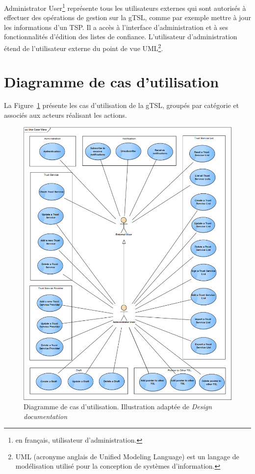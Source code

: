 \documentclass{tnreport}
\begin{document}
Administrator User\footnote{en français, utilisateur d'administration.} représente tous les utilisateurs externes qui sont autorisés à effectuer des opérations de gestion sur la gTSL, comme par exemple mettre à jour les informations d'un TSP. Il a accès à l'interface d'administration et à ses fonctionnalités d'édition des listes de confiance. L'utilisateur d'administration étend de l'utilisateur externe du point de vue UML\footnote{UML (acronyme anglais de Unified Modeling Language) est un langage de modélisation utilisé pour la conception de systèmes d'information.}.

\section{Diagramme de cas d'utilisation}

La Figure~\ref{fig:use-case-diagram} présente les cas d'utilisation de la gTSL, groupés par catégorie et associés aux acteurs réalisant les actions.

\begin{figure}[h]
	\centering
	\includegraphics[scale=0.53]{figures/use-case-diagram}
	\caption{Diagramme de cas d'utilisation. Illustration adaptée de \textit{Design documentation}~\cite{design-document}}
	\label{fig:use-case-diagram}
\end{figure}
\clearpage
\end{document}
